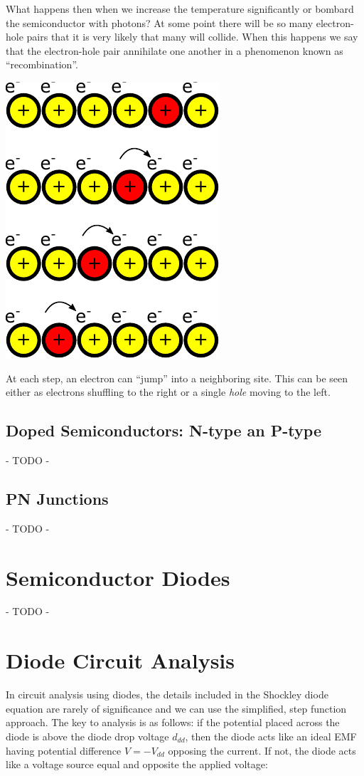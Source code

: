\documentclass{tufte-book}
\begin{document}
What happens then when we increase the temperature significantly or bombard the semiconductor with photons? At some point there will be so many electron-hole pairs that it is very likely that many will collide. When this happens we say that the electron-hole pair annihilate one another in a phenomenon known as ``recombination''.

\begin{marginfigure}%
  \includegraphics[]{jumpin_hole}
  \caption{At each step, an electron can ``jump'' into a neighboring site. This can be seen either as electrons shuffling to the right or a single \textit{hole} moving to the left.}
  \label{fig:olez}
\end{marginfigure}

\subsection{Doped Semiconductors: N-type an P-type}
- TODO -
\subsection{PN Junctions}
- TODO -
\section{Semiconductor Diodes}
- TODO -
\section{Diode Circuit Analysis}
In circuit analysis using diodes, the details included in the Shockley diode equation are rarely of significance and we can use the simplified, step function approach. The key to analysis is as follows: if the potential placed across the diode is above the diode drop voltage $d_{dd}$, then the diode acts like an ideal EMF having potential difference $V = -V_{dd}$ opposing the current. If not, the diode acts like a voltage source equal and opposite the applied voltage:
\end{document}
